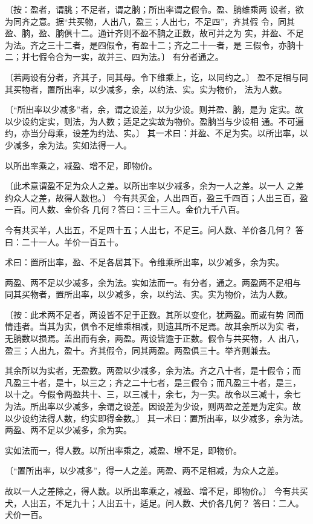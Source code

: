 \documentclass[a4paper,12pt,UTF8,twoside]{ctexbook}
\begin{document}
〔按：盈者，谓朓；不足者，谓之朒；所出率谓之假令。盈、朒维乘两 设者，欲为同齐之意。据“共买物，人出八，盈三；人出七，不足四”，齐其假 令，同其盈、朒，盈、朒俱十二。通计齐则不盈不朒之正数，故可并之为 实，并盈、不足为法。齐之三十二者，是四假令，有盈十二；齐之二十一者，是 三假令，亦朒十二；并七假令合为一实，故并三、四为法。〕 有分者通之。

〔若两设有分者，齐其子，同其母。令下维乘上，讫，以同约之。〕 盈不足相与同其买物者，置所出率，以少减多，余，以约法、实。实为物价， 法为人数。

〔“所出率以少减多”者，余，谓之设差，以为少设。则并盈、朒，是为 定实。故以少设约定实，则法，为人数；适足之实故为物价。盈朒当与少设相 通。不可遍约，亦当分母乘，设差为约法、实。〕 其一术曰：并盈、不足为实。以所出率，以少减多，余为法。实如法得一人。

以所出率乘之，减盈、增不足，即物价。

〔此术意谓盈不足为众人之差。以所出率以少减多，余为一人之差。以一人 之差约众人之差，故得人数也。〕 今有共买金，人出四百，盈三千四百；人出三百，盈一百。问人数、金价各 几何？答曰：三十三人。金价九千八百。

今有共买羊，人出五，不足四十五；人出七，不足三。问人数、羊价各几何？ 答曰：二十一人。羊价一百五十。

术曰：置所出率，盈、不足各居其下。令维乘所出率，以少减多，余为实。

两盈、两不足以少减多，余为法。实如法而一。有分者，通之。两盈两不足相与 同其买物者，置所出率，以少减多，余，以约法、实。实为物价，法为人数。

〔按：此术两不足者，两设皆不足于正数。其所以变化，犹两盈。而或有势 同而情违者。当其为实，俱令不足维乘相减，则遗其所不足焉。故其余所以为实 者，无朒数以损焉。盖出而有余，两盈。两设皆逾于正数。假令与共买物，人 出八，盈三；人出九，盈十。齐其假令，同其两盈。两盈俱三十。举齐则兼去。

其余所以为实者，无盈数。两盈以少减多，余为法。齐之八十者，是十假令；而 凡盈三十者，是十，以三之；齐之二十七者，是三假令；而凡盈三十者，是三， 以十之。今假令两盈共十、三，以三减十，余七，为一实。故令以三减十，余七 为法。所出率以少减多，余谓之设差。因设差为少设，则两盈之差是为定实。故 以少设约法得人数，约实即得金数。〕 其一术曰：置所出率，以少减多，余为法。两盈、两不足以少减多，余为实。

实如法而一，得人数。以所出率乘之，减盈、增不足，即物价。

〔“置所出率，以少减多”，得一人之差。两盈、两不足相减，为众人之差。

故以一人之差除之，得人数。以所出率乘之，减盈、增不足，即物价。〕 今有共买犬，人出五，不足九十；人出五十，适足。问人数、犬价各几何？ 答曰：二人。犬价一百。
\end{document}
